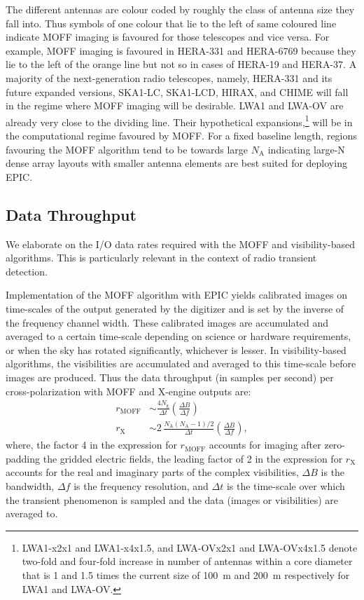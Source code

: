 \documentclass[a4paper,fleqn,usenatbib]{mnras}
\newcommand{\Nant}{N_\textrm{A}}
\newcommand{\Ngrid}{N_\textrm{g}}
\begin{document}
The different antennas are colour coded by roughly the class of antenna size they fall into. Thus symbols of one colour that lie to the left of same coloured line indicate MOFF imaging is favoured for those telescopes and vice versa. For example, MOFF imaging is favoured in HERA-331 and HERA-6769 because they lie to the left of the orange line but not so in cases of HERA-19 and HERA-37. A majority of the next-generation radio telescopes, namely, HERA-331 and its future expanded versions, SKA1-LC, SKA1-LCD, HIRAX, and CHIME will fall in the regime where MOFF imaging will be desirable. LWA1 and LWA-OV are already very close to the dividing line. Their hypothetical expansions,\footnote{LWA1-x2x1 and LWA1-x4x1.5, and LWA-OVx2x1 and LWA-OVx4x1.5 denote two-fold and four-fold increase in number of antennas within a core diameter that is 1 and 1.5 times the current size of 100~m and 200~m respectively for LWA1 and LWA-OV.} will be in the computational regime favoured by MOFF. For a fixed baseline length, regions favouring the MOFF algorithm tend to be towards large $\Nant$ indicating large-N dense array layouts with smaller antenna elements are best suited for deploying EPIC.

\subsection{Data Throughput}

We elaborate on the I/O data rates required with the MOFF and visibility-based algorithms. This is particularly relevant in the context of radio transient detection. 

Implementation of the MOFF algorithm with EPIC yields calibrated images on time-scales of the output generated by the digitizer and is set by the inverse of the frequency channel width. These calibrated images are accumulated and averaged to a certain time-scale depending on science or hardware requirements, or when the sky has rotated significantly, whichever is lesser. In visibility-based algorithms, the visibilities are accumulated and averaged to this time-scale before images are produced. Thus the data throughput (in samples per second) per cross-polarization with MOFF and X-engine outputs are: 
\begin{align}
  r_\textrm{MOFF} &\sim \frac{4\Ngrid}{\Delta t} \left(\frac{\Delta B}{\Delta f}\right) \\
  r_\textrm{X} &\sim 2\,\frac{\Nant(\Nant-1)/2}{\Delta t} \left(\frac{\Delta B}{\Delta f}\right),
\end{align}
where, the factor 4 in the expression for $r_\textrm{MOFF}$ accounts for imaging after zero-padding the gridded electric fields, the leading factor of 2 in the expression for $r_\textrm{X}$ accounts for the real and imaginary parts of the complex visibilities, $\Delta B$ is the bandwidth, $\Delta f$ is the frequency resolution, and $\Delta t$ is the time-scale over which the transient phenomenon is sampled and the data (images or visibilities) are averaged to.
\end{document}
